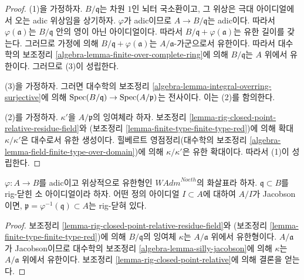\begin{proof}
(1)을 가정하자. $B/\mathfrak q$는 차원 $1$인 뇌터 국소환이고,
그 위상은 극대 아이디얼에서 오는 adic 위상임을 상기하자.
$\varphi$가 adic이므로 $A \to B/\mathfrak q$는 adic이다.
따라서 $\varphi(\mathfrak a)$는 $B/\mathfrak q$ 안의 영이 아닌 아이디얼이다.
따라서 $B/\mathfrak q + \varphi(\mathfrak a)$는 유한 길이를 갖는다.
그러므로 가정에 의해 $B/\mathfrak q + \varphi(\mathfrak a)$는
$A/\mathfrak a$-가군으로서 유한이다.
따라서 대수학의 보조정리 \ref{algebra-lemma-finite-over-complete-ring}에 의해
$B/\mathfrak q$는 $A$ 위에서 유한이다. 그러므로 (3)이 성립한다.

\medskip\noindent
(3)을 가정하자. 그러면 대수학의 보조정리
\ref{algebra-lemma-integral-overring-surjective}에 의해
$\mathop{\mathrm{Spec}}(B/\mathfrak q) \to \mathop{\mathrm{Spec}}(A/\mathfrak p)$는 전사이다.
이는 (2)를 함의한다.

\medskip\noindent
(2)를 가정하자. $\kappa'$을 $A/\mathfrak p$의 잉여체라 하자.
보조정리 \ref{lemma-rig-closed-point-relative-residue-field}와
(보조정리 \ref{lemma-finite-type-finite-type-red})에 의해
확대 $\kappa/\kappa'$은 대수로서 유한 생성이다.
힐베르트 영점정리(대수학의 보조정리
\ref{algebra-lemma-field-finite-type-over-domain})에 의해
$\kappa/\kappa'$은 유한 확대이다. 따라서 (1)이 성립한다.
\end{proof}

\begin{lemma}
\label{lemma-rig-closed-jacobson}
$\varphi : A \to B$를 adic이고 위상적으로 유한형인
$\textit{WAdm}^{Noeth}$의 화살표라 하자.
$\mathfrak q \subset B$를 rig-닫힌 소 아이디얼이라 하자.
어떤 정의 아이디얼 $I \subset A$에 대하여 $A/I$가 Jacobson이면,
$\mathfrak p = \varphi^{-1}(\mathfrak q) \subset A$는 rig-닫혀 있다.
\end{lemma}

\begin{proof}
보조정리 \ref{lemma-rig-closed-point-relative-residue-field}와
(보조정리 \ref{lemma-finite-type-finite-type-red})에 의해
$B/\mathfrak q$의 잉여체 $\kappa$는 $A/\mathfrak a$ 위에서 유한형이다.
$A/\mathfrak a$가 Jacobson이므로 대수학의 보조정리
\ref{algebra-lemma-silly-jacobson}에 의해 $\kappa$는
$A/\mathfrak a$ 위에서 유한이다. 보조정리
\ref{lemma-rig-closed-point-relative}에 의해 결론을 얻는다.
\end{proof}

